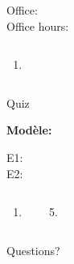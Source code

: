 \documentclass{beamer}
\subtitle[Temps et \lexi{quel}]{Le temps et les questions avec \lexi{quel}}
\begin{document}
  \begin{frame}
    \titlepage
    \tiny{Office: \\
          Office hours: }
  \end{frame}

  \begin{frame}{}
    \begin{columns}
      \scriptsize
        
        \begin{enumerate}
          \item 
        \end{enumerate}
        \begin{minipage}[0.6\textheight]{\linewidth}
          \begin{center}
          \end{center}
        \end{minipage}
    \end{columns}
  \end{frame}

  \begin{frame}{}
    \begin{center}
      \Large Quiz
    \end{center}
  \end{frame}

  \begin{frame}{}
    
    \begin{description}
      \item[\textbf{Modèle:}] \textit{}
      \item[E1:] 
      \item[E2:] 
    \end{description}
    \begin{columns}[t]
        \begin{enumerate}
          \item 
        \end{enumerate}
        \begin{enumerate}
          \setcounter{enumi}{4}
          \item 
        \end{enumerate}
    \end{columns}
  \end{frame}

  \begin{frame}{}
    \begin{center}
      \Large Questions?
    \end{center}
  \end{frame}
\end{document}
